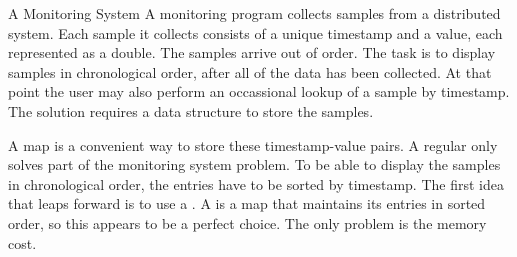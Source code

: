 







 \begin{example}{A Monitoring System}
   A monitoring program collects samples from a distributed
   system. Each sample it collects consists of a unique timestamp and a
   value, each represented as a double. The samples arrive out of
   order. The task is to display samples in chronological order, after all of
   the data has been collected. At that point the user may also perform an
   occassional lookup of a sample by timestamp. The
   solution requires a data structure to store the samples.
\end{example}

A map is a convenient way to store these timestamp-value pairs. A regular
 only solves part of the monitoring system problem. To be able
to display the samples in chronological order, the entries have to be sorted by
timestamp.
The first idea that leaps forward is to use a . A
 is a map that maintains its entries in sorted order, so this
appears to be a perfect choice. The only problem is the memory cost.

